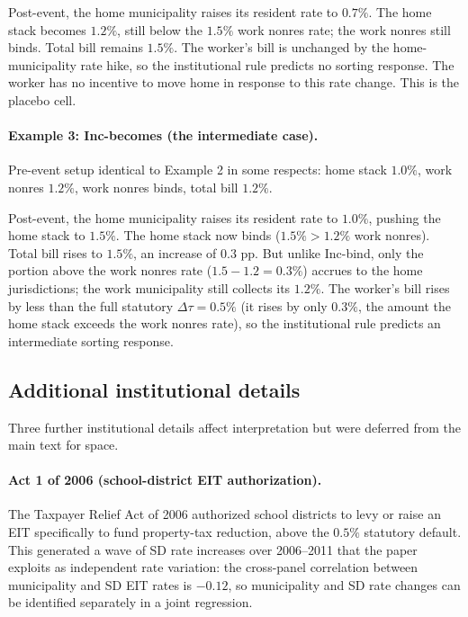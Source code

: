 \documentclass[12pt]{article}
\begin{document}
Post-event, the home municipality raises its resident rate to $0.7\%$. The
home stack becomes $1.2\%$, still below the $1.5\%$ work nonres
rate; the work nonres still binds. Total bill remains $1.5\%$.
The worker's bill is unchanged by the home-municipality rate hike, so the
institutional rule predicts no sorting response. The worker has no
incentive to move home in response to this rate change. This is
the placebo cell.

\paragraph{Example 3: Inc-becomes (the intermediate case).}
Pre-event setup identical to Example 2 in some respects: home stack
$1.0\%$, work nonres $1.2\%$, work nonres binds, total bill
$1.2\%$.

Post-event, the home municipality raises its resident rate to $1.0\%$,
pushing the home stack to $1.5\%$. The home stack now binds
($1.5\% > 1.2\%$ work nonres). Total bill rises to $1.5\%$, an
increase of $0.3$ pp. But unlike Inc-bind, only the portion above
the work nonres rate ($1.5 - 1.2 = 0.3\%$) accrues to the home
jurisdictions; the work municipality still collects its $1.2\%$. The
worker's bill rises by less than the full statutory $\Delta\tau =
0.5\%$ (it rises by only $0.3\%$, the amount the home stack
exceeds the work nonres rate), so the institutional rule predicts
an intermediate sorting response.

\subsection{Additional institutional details}
\label{app:theory-institutional}

Three further institutional details affect interpretation but were
deferred from the main text for space.

\paragraph{Act 1 of 2006 (school-district EIT authorization).}
The Taxpayer Relief Act of 2006 authorized school districts to
levy or raise an EIT specifically to fund property-tax reduction,
above the $0.5\%$ statutory default. This generated a wave of SD
rate increases over 2006--2011 that the paper exploits as
independent rate variation: the cross-panel correlation between
municipality and SD EIT rates is $-0.12$, so municipality and SD rate changes can
be identified separately in a joint regression.
\end{document}
